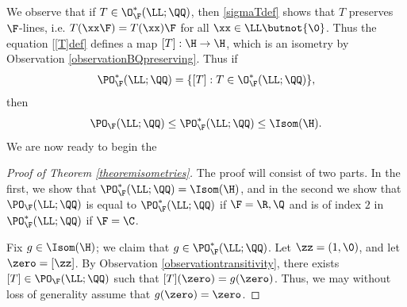 We observe that if $T\in\O_\F^*(\LL;\QQ)$, then \eqref{sigmaTdef} shows that $T$ preserves $\F$-lines, i.e. $T(\xx\F) = T(\xx)\F$ for all $\xx\in\LL\butnot\{\0\}$. Thus the equation \eqref{[T]def} defines a map $[T]:\H\to\H$, which is an isometry by Observation \ref{observationBQpreserving}. Thus if
\[
\PO_\F^*(\LL;\QQ) = \{[T] : T\in\O_\F^*(\LL;\QQ)\},
\]
then
\[
\PO_\F(\LL;\QQ) \leq \PO_\F^*(\LL;\QQ) \leq \Isom(\H).
\]
We are now ready to begin the
\begin{proof}[Proof of Theorem \ref{theoremisometries}]
The proof will consist of two parts. In the first, we show that $\PO_\F^*(\LL;\QQ) = \Isom(\H)$, and in the second we show that $\PO_\F(\LL;\QQ)$ is equal to $\PO_\F^*(\LL;\QQ)$ if $\F = \R,\Q$ and is of index $2$ in $\PO_\F^*(\LL;\QQ)$ if $\F = \C$.

Fix $g\in \Isom(\H)$; we claim that $g\in\PO_\F^*(\LL;\QQ)$. Let $\zz = (1,\0)$, and let $\zero = [\zz]$. By Observation \ref{observationtransitivity}, there exists $[T]\in \PO_\F(\LL;\QQ)$ such that $[T](\zero) = g(\zero)$. Thus, we may without loss of generality assume that $g(\zero) = \zero$.


\end{proof}
